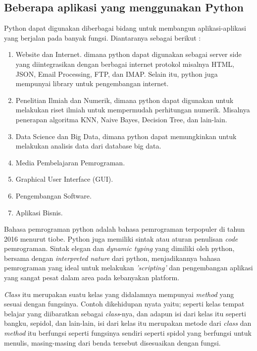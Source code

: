 \subsection{Beberapa aplikasi yang menggunakan Python}
Python dapat digunakan diberbagai bidang untuk membangun aplikasi-aplikasi yang berjalan pada banyak fungsi. Diantaranya sebagai berikut :
\begin{enumerate}
\item Website dan Internet. dimana python dapat digunakan sebagai server side yang diintegrasikan dengan berbagai internet protokol misalnya HTML, JSON, Email Processing, FTP, dan IMAP. Selain itu, python juga mempunyai library untuk pengembangan internet.
\item Penelitian Ilmiah dan Numerik, dimana python dapat digunakan untuk melakukan riset ilmiah untuk mempermudah perhitungan numerik. Misalnya penerapan algoritma KNN, Naive Bayes, Decision Tree, dan lain-lain.
\item Data Science dan Big Data, dimana python dapat memungkinkan untuk melakukan analisis data dari database big data.
\item Media Pembelajaran Pemrograman.
\item Graphical User Interface (GUI).
\item Pengembangan Software.
\item Aplikasi Bisnis.
\end{enumerate}

\par
Bahasa pemrograman python adalah bahasa pemrograman terpopuler di tahun 2016 menurut tiobe\cite{https://www.tiobe.com/tiobe-index/}. Python juga memiliki sintak atau aturan penulisan \textit{code} pemrograman. Sintak elegan dan \textit{dynamic typing} yang dimiliki oleh python, bersama dengan \textit{interpreted nature} dari python, menjadikannya bahasa pemrograman yang ideal untuk melakukan \textit{'scripting'} dan pengembangan aplikasi yang sangat pesat dalam area pada kebanyakan platform.

\textit{Class} itu merupakan suatu kelas yang didalamnya mempunyai \textit{method} yang sesuai dengan fungsinya. Contoh dikehidupan nyata yaitu; seperti kelas tempat belajar yang diibaratkan sebagai \textit{class}-nya, dan adapun isi dari kelas itu seperti bangku, sepidol, dan lain-lain, isi dari kelas itu merupakan metode dari \textit{class} dan \textit{method} itu berfungsi seperti fungsinya sendiri seperti spidol yang berfungsi untuk menulis, masing-masing dari benda tersebut disesuaikan dengan fungsi.


